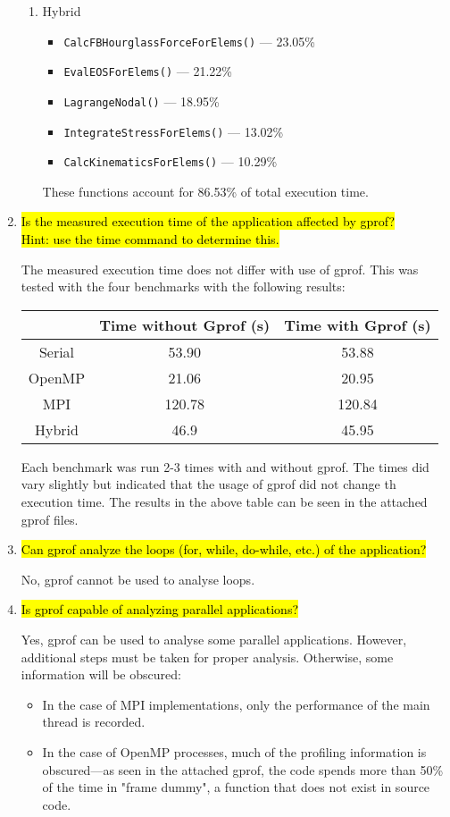 \documentclass{article}
\begin{document}
\begin{enumerate}
\begin{enumerate}
		\item Hybrid
		\begin{itemize}
			\item \verb!CalcFBHourglassForceForElems()! --- 23.05\%
			\item \verb!EvalEOSForElems()! --- 21.22\%
			\item \verb!LagrangeNodal()! --- 18.95\%
			\item \verb!IntegrateStressForElems()! --- 13.02\%
			\item \verb!CalcKinematicsForElems()! --- 10.29\%
		\end{itemize}
		These functions account for 86.53\% of total execution time.
	\end{enumerate}

	\item \hl{Is the measured execution time of the application affected by gprof? \\Hint: use the time command to determine this.}

	The measured execution time does not differ with use of gprof. This was tested with the four benchmarks with the following results:
	\begin{center}
		\begin{tabular}{|c|c|c|}
			\hline
			&Time without Gprof (s) & Time with Gprof (s)\\
			\hline
			Serial &53.90&53.88\\ \hline
			OpenMP &21.06&20.95\\ \hline
			MPI &120.78&120.84\\ \hline
			Hybrid &46.9&45.95\\ \hline
		\end{tabular}
	\end{center}
	Each benchmark was run 2-3 times with and without gprof. The times did vary slightly but indicated that the usage of gprof did not change th execution time. The results in the above table can be seen in the attached gprof files.

	\item \hl{Can gprof analyze the loops (for, while, do-while, etc.) of the application?}

	No, gprof cannot be used to analyse loops.
	
	\item \hl{Is gprof capable of analyzing parallel applications?}

	Yes, gprof can be used to analyse some parallel applications. However, additional steps must be taken for proper analysis. Otherwise, some information will be obscured:
	\begin{itemize}
		\item In the case of MPI implementations, only the performance of the main thread is recorded. 
		\item In the case of OpenMP processes, much of the profiling information is obscured---as seen in the attached gprof, the code spends more than 50\% of the time in "frame dummy", a function that does not exist in source code.
	\end{itemize}


\end{enumerate}
\end{document}

